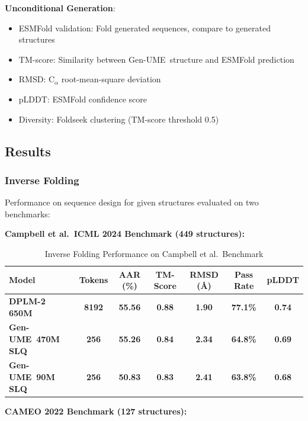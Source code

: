 \documentclass[11pt,a4paper]{article}
\newcommand{\genume}{Gen-UME}
\begin{document}
\textbf{Unconditional Generation}:
\begin{itemize}
\item ESMFold validation: Fold generated sequences, compare to generated structures
\item TM-score: Similarity between \genume~structure and ESMFold prediction
\item RMSD: C$_\alpha$ root-mean-square deviation
\item pLDDT: ESMFold confidence score
\item Diversity: Foldseek clustering (TM-score threshold 0.5)
\end{itemize}

\subsection{Results}

\subsubsection{Inverse Folding}

Performance on sequence design for given structures evaluated on two benchmarks:

\textbf{Campbell et al.~ICML 2024 Benchmark (449 structures):}

\begin{table}[h]
\centering
\small
\caption{Inverse Folding Performance on Campbell et al.~Benchmark}
\begin{tabular}{@{}lcccccc@{}}
\toprule
\textbf{Model} & \textbf{Tokens} & \textbf{AAR (\%)} & \textbf{TM-Score} & \textbf{RMSD (Å)} & \textbf{Pass Rate} & \textbf{pLDDT} \\
\midrule
\textbf{DPLM-2 650M} \cite{wang2024} & \textbf{8192} & \textbf{55.56} & \textbf{0.88} & \textbf{1.90} & \textbf{77.1\%} & \textbf{0.74} \\
\textbf{\genume~470M SLQ} & \textbf{256} & \textbf{55.26} & \textbf{0.84} & \textbf{2.34} & \textbf{64.8\%} & \textbf{0.69} \\
\textbf{\genume~90M SLQ} & \textbf{256} & \textbf{50.83} & \textbf{0.83} & \textbf{2.41} & \textbf{63.8\%} & \textbf{0.68} \\
\bottomrule
\end{tabular}
\label{tab:inverse_folding_campbell}
\end{table}

\textbf{CAMEO 2022 Benchmark (127 structures):}
\end{document}
